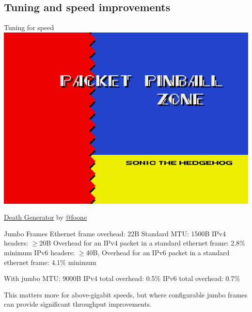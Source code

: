 \documentclass[bigger]{beamer}
\begin{document}
\subsection{Tuning and speed improvements}
\label{sec:orgb9c111a}
\begin{frame}{Tuning for speed}
    \centering
    \includegraphics[height=0.75\textheight]{./assets/packet-pinball.png}
    
    \raggedleft
    \small
    \href{http://deathgenerator.com}{Death Generator} by \href{https://twitter.com/foone}{@foone}
\end{frame}

\begin{frame}[label={sec:org13ce3d4}]{Jumbo Frames}
  Ethernet frame overhead: 22B
  Standard MTU: 1500B
  IPv4 headers: $\geq$20B
  Overhead for an IPv4 packet in a standard ethernet frame: 2.8\% minimum
  IPv6 headers: $\geq$40B,
  Overhead for an IPv6 packet in a standard ethernet frame: 4.1\% minimum

  With jumbo MTU: 9000B
  IPv4 total overhead: 0.5\%
  IPv6 total overhead: 0.7\%

  This matters more for above-gigabit speeds, but where configurable jumbo frames can provide significant throughput improvements.

\end{frame}
\end{document}
